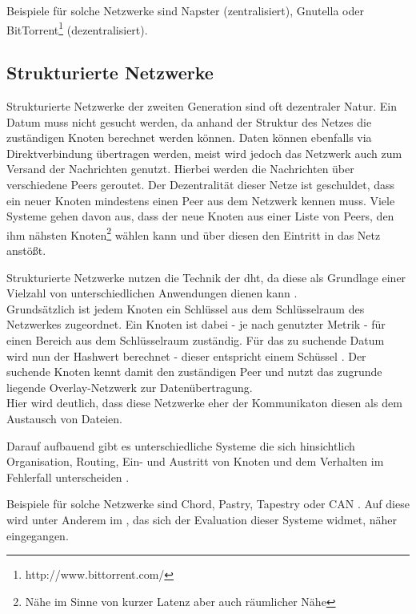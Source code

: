 Beispiele für solche Netzwerke sind Napster (zentralisiert), Gnutella oder BitTorrent\footnote{http://www.bittorrent.com/} (dezentralisiert).

\subsection{Strukturierte Netzwerke}
Strukturierte Netzwerke der zweiten Generation sind oft dezentraler Natur. Ein Datum muss nicht gesucht werden, da anhand der Struktur des Netzes die zuständigen Knoten berechnet werden können. Daten können ebenfalls via Direktverbindung übertragen werden, meist wird jedoch das Netzwerk auch zum Versand der Nachrichten genutzt. Hierbei werden die Nachrichten über verschiedene Peers geroutet. Der Dezentralität dieser Netze ist geschuldet, dass ein neuer Knoten mindestens einen Peer aus dem Netzwerk kennen muss. Viele Systeme gehen davon aus, dass der neue Knoten aus einer Liste von Peers, den ihm nähsten Knoten\footnote{Nähe im Sinne von kurzer Latenz aber auch räumlicher Nähe} wählen kann und über diesen den Eintritt in das Netz anstößt.

Strukturierte Netzwerke nutzen die Technik der \ac{dht}, da diese als Grundlage einer Vielzahl von unterschiedlichen Anwendungen dienen kann \cite{Wehrle2005, Ghodsi2006AlgorithmsDHT}.\\
Grundsätzlich ist jedem Knoten ein Schlüssel aus dem Schlüsselraum des Netzwerkes zugeordnet. Ein Knoten ist dabei - je nach genutzter Metrik - für einen Bereich aus dem Schlüsselraum zuständig. Für das zu suchende Datum wird nun der Hashwert berechnet - dieser entspricht einem Schüssel \cite{BalakrishnanLooking}. Der suchende Knoten kennt damit den zuständigen Peer und nutzt das zugrunde liegende Overlay-Netzwerk zur Datenübertragung.\\
Hier wird deutlich, dass diese Netzwerke eher der Kommunikaton diesen als dem Austausch von Dateien.

Darauf aufbauend gibt es unterschiedliche Systeme die sich hinsichtlich Organisation, Routing, Ein- und Austritt von Knoten und dem Verhalten im Fehlerfall unterscheiden \cite{Goetz2005, Lua2005Survey}.

Beispiele für solche Netzwerke sind Chord, Pastry, Tapestry oder CAN \cite{Hosseini2007Survey, Rowstron2001, Zhao2001Tapestry,Zhao2004Tapestry, Ratnasamy2001Scalable}. Auf diese wird unter Anderem im , das sich der Evaluation dieser Systeme widmet, näher eingegangen.
